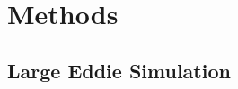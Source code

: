 
\chapter{Methods}
\label{ch:methods}

\section{Large Eddie Simulation}
\label{sec:LargeEddieSimulation}


\endinput

Any text after an \endinput is ignored.
You could put scraps here or things in progress.
